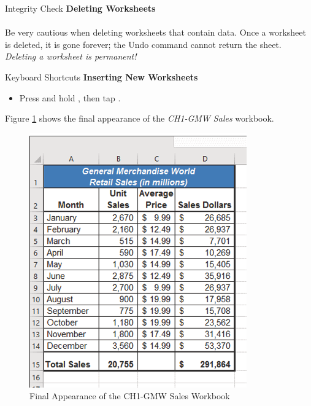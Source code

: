 \begin{center}
	\begin{infobox}{Integrity Check}
		\textbf{Deleting Worksheets}
		\\
		\\
		Be very cautious when deleting worksheets that contain data. Once a worksheet is deleted, it is gone forever; the Undo command cannot return the sheet. \textit{Deleting a worksheet is permanent!}
	\end{infobox}
\end{center}

\begin{center}
	\begin{shtcutbox}{Keyboard Shortcuts}
		\textbf{Inserting New Worksheets}
		\\
		\begin{itemize}
			\setlength{\itemsep}{0pt}
			\setlength{\parskip}{0pt}
			\setlength{\parsep}{0pt}
			
			\item Press and hold , then tap .
			
		\end{itemize}
	\end{shtcutbox}
\end{center}


Figure \ref{01:fig48} shows the final appearance of the \textit{CH1-GMW Sales} workbook.

\begin{figure}[H]
	\centering
	\includegraphics[width=\maxwidth{.95\linewidth}]{gfx/ch01_fig48}
	\caption{Final Appearance of the CH1-GMW Sales Workbook}
	\label{01:fig48}
\end{figure}

